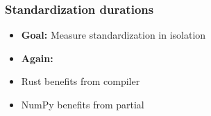 \documentclass[t,english]{beamer}
\begin{document}
\begin{frame}
    \frametitle{Standardization durations}
        \begin{itemize}
        \item \textbf{Goal:} Measure standardization in isolation
        \end{itemize}
    \begin{itemize}
        \item<3-> \textbf{Again:}
        \item<3-> Rust benefits from compiler
        \item<3->  NumPy benefits from partial
    \end{itemize}
\end{frame}
\end{document}
